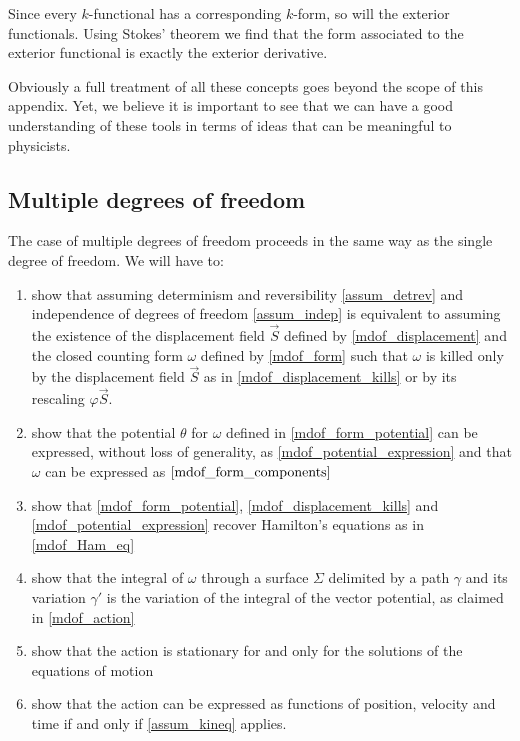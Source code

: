 \documentclass[10pt,twocolumn, nofootinbib]{revtex4-2}
\begin{document}
Since every $k$-functional has a corresponding $k$-form, so will the exterior functionals. Using Stokes' theorem we find that the form associated to the exterior functional is exactly the exterior derivative.

Obviously a full treatment of all these concepts goes beyond the scope of this appendix. Yet, we believe it is important to see that we can have a good understanding of these tools in terms of ideas that can be meaningful to physicists. 

\fi

\subsection*{Multiple degrees of freedom}

The case of multiple degrees of freedom proceeds in the same way as the single degree of freedom. We will have to:
\begin{enumerate}[label=(\roman*)]
	\item show that assuming determinism and reversibility \ref{assum_detrev} and independence of degrees of freedom \ref{assum_indep} is equivalent to assuming the existence of the displacement field $\vec{S}$ defined by \ref{mdof_displacement} and the closed counting form $\omega$ defined by \ref{mdof_form} such that $\omega$ is killed only by the displacement field $\vec{S}$ as in \ref{mdof_displacement_kills} or by its rescaling $\varphi \vec{S}$.
	\item show that the potential $\theta$ for $\omega$ defined in \ref{mdof_form_potential} can be expressed, without loss of generality, as \ref{mdof_potential_expression} and that $\omega$ can be expressed as $\ref{mdof_form_components}$
	\item show that \ref{mdof_form_potential}, \ref{mdof_displacement_kills} and \ref{mdof_potential_expression} recover Hamilton's equations as in \ref{mdof_Ham_eq}
	\item show that the integral of $\omega$ through a surface $\Sigma$ delimited by a path $\gamma$ and its variation $\gamma'$ is the variation of the integral of the vector potential, as claimed in \ref{mdof_action}
	\item show that the action is stationary for and only for the solutions of the equations of motion
	\item show that the action can be expressed as functions of position, velocity and time if and only if \ref{assum_kineq} applies.
\end{enumerate}
\end{document}
